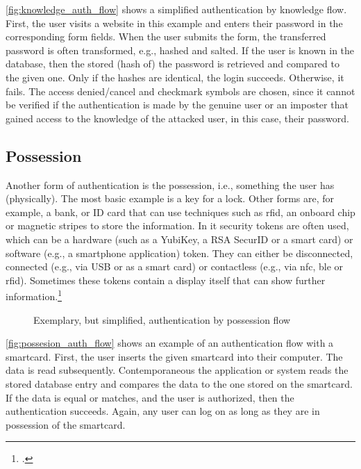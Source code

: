 \autoref{fig:knowledge_auth_flow} shows a simplified authentication by knowledge flow. First, the user visits a website in this example and enters their password in the corresponding form fields. When the user submits the form, the transferred password is often transformed, e.g., hashed and salted. If the user is known in the database, then the stored (hash of) the password is retrieved and compared to the given one. Only if the hashes are identical, the login succeeds. Otherwise, it fails. The \frqq access denied/cancel\flqq{} and \frqq checkmark\flqq{} symbols are chosen, since it cannot be verified if the authentication is made by the genuine user or an imposter that gained access to the knowledge of the attacked user, in this case, their password.

\subsection{Possession}

Another form of authentication is the possession, i.e., \frqq something the user has\flqq{} (physically). The most basic example is a key for a lock. Other forms are, for example, a bank, or ID card that can use techniques such as \gls{rfid}, an onboard chip or magnetic stripes to store the information. In \gls{it} security tokens are often used, which can be a hardware (such as a YubiKey, a RSA SecurID or a smart card) or software (e.g., a smartphone application) token. They can either be disconnected, connected (e.g., via USB or as a smart card) or contactless (e.g., via \gls{nfc}, \gls{ble} or \gls{rfid}). Sometimes these tokens contain a display itself that can show further information.\footcites[See][24]{265831}[][]{Dressel:2019:SZT:3319499.3328225}[See][8--11]{1698485}

\begin{figure}[hbt]
	\centering
	
	\caption[Exemplary, but simplified, authentication by possession flow]{Exemplary, but simplified, authentication by possession flow\footnotemark}
	\label{fig:possesion_auth_flow}
\end{figure}

\autoref{fig:possesion_auth_flow} shows an example of an authentication flow with a smartcard. First, the user inserts the given smartcard into their computer. The data is read subsequently. Contemporaneous the application or system reads the stored database entry and compares the data to the one stored on the smartcard. If the data is equal or matches, and the user is authorized, then the authentication succeeds. Again, any user can log on as long as they are in possession of the smartcard.

